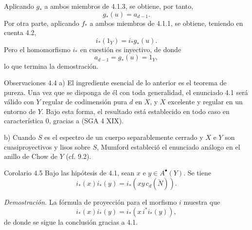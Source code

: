 Aplicando $g_*$ a ambos miembros de 4.1.3, se obtiene, por tanto,
\[
g_*(u)=a_{d-1}.
\tag{4.1.6}
\]
Por otra parte, aplicando $f_*$ a ambos miembros de 4.1.1, se obtiene, teniendo en cuenta 4.2,
\[
i_*(1_Y)=i_*g_*(u).
\tag{4.1.7}
\]
Pero el homomorfismo $i_*$ en cuestión es inyectivo, de donde
\[
a_{d-1}=g_*(u)=1_Y,
\]
lo que termina la demostración.

\begin{statement}{Observaciones 4.4}
a) El ingrediente esencial de lo anterior es el teorema de pureza. Una vez que se disponga de él con toda generalidad, el enunciado 4.1 será válido con $Y$ regular de codimensión pura $d$ en $X$, y $X$ excelente y regular en un entorno de $Y$. Bajo esta forma, el resultado está establecido en todo caso en característica $0$, gracias a (SGA 4 XIX).

b) Cuando $S$ es el espectro de un cuerpo separablemente cerrado y $X$ e $Y$ son cuasiproyectivos y lisos sobre $S$, Mumford estableció el enunciado análogo en el anillo de Chow de $Y$ (cf. 9.2).
\end{statement}

\begin{statement}{Corolario 4.5}
Bajo las hipótesis de 4.1, sean $x$ e $y\in A^\bullet(Y)$. Se tiene
\[
i_*(x)i_*(y)=i_*(xy\,c_d(\check N)).
\]
\end{statement}

\emph{Demostración.} La fórmula de proyección para el morfismo $i$ muestra que
\[
i_*(x)i_*(y)=i_*(x\,i^*i_*(y)),
\]
de donde se sigue la conclusión gracias a 4.1.
